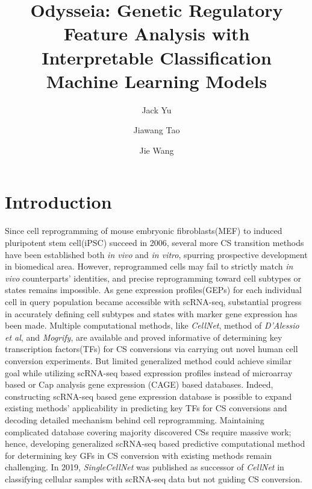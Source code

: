 \documentclass[fleqn,10pt]{wlscirep}
\title{Odysseia: Genetic Regulatory Feature Analysis with Interpretable Classification Machine Learning Models}
\author[1,*1]{Jack Yu}
\author[1,]{Jiawang Tao}
\author[1,*2]{Jie Wang}
\affil[1]{Center for Health Research, Guangzhou Institutes of Biomedicine and Health, Chinese Academy of Sciences, Guangzhou 510530, China}
\affil[*1]{Correspondence: gyu17@alumni.jh.edu}
\affil[*2]{Correspondence: wang\_jie01@gibh.ac.cn}
\begin{document}
\flushbottom
\maketitle
%
%
\thispagestyle{empty}
\section*{Introduction}
Since cell reprogramming of mouse embryonic fibroblasts(MEF) to induced pluripotent stem cell(iPSC) succeed in 2006\cite{yamanaka_2006}, several more CS transition methods have been established both \emph{in vivo} and \emph{in vitro}\cite{fibroblast_sertoli_2012,fibro_cardio_2012,mef_hept_2011}, spurring prospective development in biomedical area.
However, reprogrammed cells may fail to strictly match \emph{in vivo} counterparts' identities\cite{ASCL1_dopaminergic_neuron_2021}, and precise reprogramming toward cell subtypes or states remains impossible\cite{cell_repro_review}.
As gene expression profiles(GEPs) for each individual cell in query population became accessible with scRNA-seq, substantial progress in accurately defining cell subtypes and states with marker gene expression has been made\cite{pancreas_subtypes_2016,lung_subtypes_2014}.
Multiple computational methods, like \emph{CellNet}\cite{cellnet_2014}, method of \emph{D’Alessio et al}\cite{dalessio_2015}, and \emph{Mogrify}\cite{mogrify_2016}, are available and proved informative of determining key transcription factors(TFs) for CS conversions via carrying out novel human cell conversion experiments.
But limited generalized method could achieve similar goal while utilizing scRNA-seq based expression profiles instead of microarray based or Cap analysis gene expression (CAGE) based databases.
Indeed, constructing scRNA-seq based gene expression database is possible to expand existing methods' applicability in predicting key TFs for CS conversions and decoding detailed mechanism behind cell reprogramming.
Maintaining complicated database covering majority discovered CSs require massive work; hence, developing generalized scRNA-seq based predictive computational method for determining key GFs in CS conversion with existing methods remain challenging.
In 2019, \emph{SingleCellNet}\cite{scn_2019} was published as successor of \emph{CellNet} in classifying cellular samples with scRNA-seq data but not guiding CS conversion.
\end{document}
